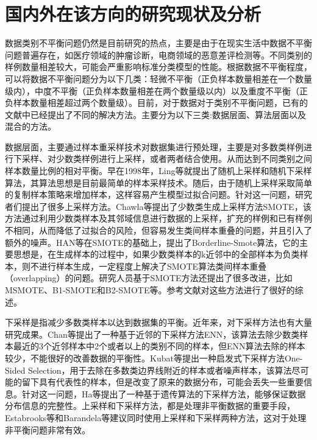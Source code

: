 \documentclass{article}
\newcommand{\upcite}[1]{\textsuperscript{\textsuperscript{\cite{#1}}}} %
\begin{document}
\section{国内外在该方向的研究现状及分析}
数据类别不平衡问题仍然是目前研究的热点，主要是由于在现实生活中数据不平衡问题普遍存在，如医疗领域的肿瘤诊断，电商领域的恶意差评检测等。不同类别的样例数量相差较大，可能会严重影响标准分类模型的性能。根据数据不平衡程度，可以将数据不平衡问题分为以下几类：轻微不平衡（正负样本数量相差在一个数量级内），中度不平衡（正负样本数量相差在两个数量级以内）以及重度不平衡（正负样本数量相差超过两个数量级）。目前，对于数据对于类别不平衡问题，已有的文献中已经提出了不同的解决方法。主要分为以下三类\upcite{spelmen2018review}:数据层面、算法层面以及混合的方法。
\par
数据层面，主要通过样本重采样技术对数据集进行预处理，主要是对多数类样例进行下采样、对少数类样例进行上采样，或者两者结合使用。从而达到不同类别之间样本数量比例的相对平衡。早在1998年，Ling等\upcite{ling1998data}就提出了随机上采样和随机下采样算法，其算法思想是目前最简单的样本采样技术。随后，由于随机上采样采取简单的复制样本策略来增加样本，这样容易产生模型过拟合问题。针对这一问题，研究者们提出了很多上采样方法。Chawla等\upcite{chawla2002smote}提出了少数类生成上采样方法SMOTE，该方法通过利用少数类样本及其邻域信息进行数据的上采样，扩充的样例和已有样例不相同，从而降低了过拟合的风险，但容易发生类间样本重叠的问题，并且引入了额外的噪声。HAN等\upcite{han2005borderline}在SMOTE的基础上，提出了Borderline-Smote算法，它的主要思想是，在生成样本的过程中，如果少数类样本的k近邻中的全部样本为负类样本，则不进行样本生成，一定程度上解决了SMOTE算法类间样本重叠（overlapping）的问题。研究人员基于SMOTE方法还提出了很多改进，比如MSMOTE\upcite{hu2009msmote}、B1-SMOTE和B2-SMOTE等\upcite{saez2015smote}。参考文献\upcite{ali2019imbalance,haixiang2017learning}对这些方法进行了很好的综述。
\par
下采样是指减少多数类样本以达到数据集的平衡。近年来，对下采样方法也有大量研究成果。Chan等\upcite{laurikkala2001improving}提出了一种基于近邻的下采样方法ENN，该算法去除少数类样本最近的3个近邻样本中2个或者以上的类别不同的样本，但ENN算法去除的样本较少，不能很好的改善数据的平衡性。Kubat等\upcite{kubat1997addressing}提出一种启发式下采样方法One-Sided Selection，用于去除在多数类边界线附近的样本或者噪声样本，该算法尽可能的留下具有代表性的样本，但是改变了原来的数据分布，可能会丢失一些重要信息。针对这一问题，Ha等\upcite{ha2016new}提出了一种基于遗传算法的下采样方法，能够保证数据分布信息的完整性。上采样和下采样方法，都是处理非平衡数据的重要手段，
Estabrooks等\upcite{estabrooks2004multiple}和Barandela等\upcite{barandela2004imbalanced}建议同时使用上采样和下采样两种方法，这对于处理非平衡问题非常有效。
\end{document}
